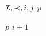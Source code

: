 \begin{algorithmic}[1]
  \REQUIRE \( \mathcal{I}, \prec, i, j \)
  \ENSURE \( p \)

      \RETURN  \( p \)
    \ENDIF
  \ENDFOR
  \RETURN \( i + 1 \)
\end{algorithmic}
